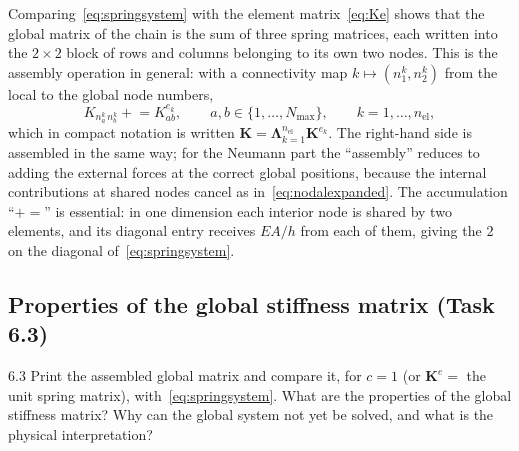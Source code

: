 \documentclass[11pt,a4paper]{article}
\numberwithin{equation}{section}
\theoremstyle{remark}
\newcommand{\bK}{\bm{K}}
\begin{document}
Comparing~\eqref{eq:springsystem} with the element matrix~\eqref{eq:Ke} shows that the
global matrix of the chain is the sum of three spring matrices, each written into the
$2\times2$ block of rows and columns belonging to its own two nodes. This is the assembly
operation in general: with a connectivity map $k \mapsto (n^k_1, n^k_2)$ from the local to
the global node numbers,
\begin{equation}\label{eq:assembly}
  K_{n^k_a\,n^k_b} \mathrel{+}= K^{e_k}_{ab},
  \qquad a,b \in \{1,\dots,N_{\max}\},
  \qquad k = 1,\dots,n_{\mathrm{el}},
\end{equation}
which in compact notation is written $\bK = \bm{\Lambda}_{k=1}^{n_{\mathrm{el}}}\bK^{e_k}$.
The right-hand side is assembled in the same way; for the Neumann part the ``assembly''
reduces to adding the external forces at the correct global positions, because the internal
contributions at shared nodes cancel as in~\eqref{eq:nodalexpanded}. The accumulation
``$\mathrel{+}=$'' is essential: in one dimension each interior node is shared by two
elements, and its diagonal entry receives $EA/h$ from each of them, giving the $2$ on the
diagonal of~\eqref{eq:springsystem}.

\subsection{Properties of the global stiffness matrix (Task 6.3)}\label{sec:properties}

\begin{task}{6.3}
  Print the assembled global matrix and compare it, for $c = 1$ (or $\bK^e = $ the unit
  spring matrix), with~\eqref{eq:springsystem}. What are the properties of the global
  stiffness matrix? Why can the global system not yet be solved, and what is the physical
  interpretation?
\end{task}
\end{document}
